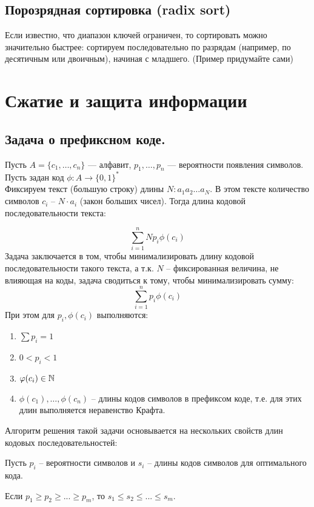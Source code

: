 \section{Порозрядная сортировка (radix sort)}

Если известно, что диапазон ключей ограничен, то сортировать можно значительно
быстрее: сортируем последовательно по разрядам (например, по десятичным или
двоичным), начиная с младшего. (Пример придумайте сами)


\chapter{Сжатие и защита информации}

\section{Задача о префиксном коде.}


Пусть $A = \{c_1, \ldots, c_n\}$ --- алфавит, $p_1, \ldots, p_n$ --- вероятности появления символов. Пусть задан код $\phi: A \to \{0, 1\}^*$\\
Фиксируем текст (большую строку) длины $N: a_1 a_2\ldots a_N$. В этом тексте количество символов $c_i$ -- $N \cdot a_i$ (закон больших чисел). Тогда длина кодовой последовательности текста:

\[\sum_{i=1}^{n} N p_i \phi(c_i)\]
Задача заключается в том, чтобы минимализировать длину кодовой последовательности такого текста,
а т.к. $N$ -- фиксированная величина, не влияющая на коды, задача сводиться к тому, чтобы минимализировать сумму:
\[\sum_{i=1}^{n}p_i \phi(c_i)\]
При этом для $p_i, \phi(c_i)$ выполняются:
\begin{enumerate}
    \item $\sum p_i = 1$
    \item $0 < p_i < 1$
    \item $\varphi(c_i) \in \mathbb{N}$
    \item $\phi(c_1), \ldots, \phi(c_n)$ -- длины кодов символов в префиксом коде, т.е. для этих длин выполняется неравенство Крафта.
\end{enumerate}

Алгоритм решения такой задачи основывается на нескольких свойств длин кодовых последовательностей:
\begin{lemma}
    Пусть $p_i$ -- вероятности символов и $s_i$ -- длины кодов символов для оптимального кода.

    Если $p_1 \geqslant p_2 \geqslant...\geqslant p_m$, то $s_1 \leqslant s_2 \leqslant...\leqslant s_m$.
\end{lemma}

